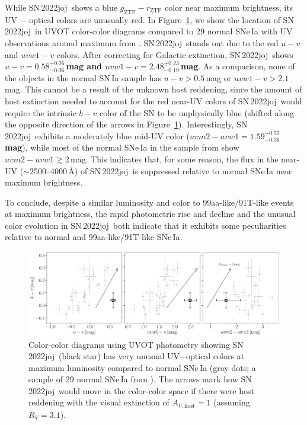 \documentclass[twocolumn]{aastex631}
\newcommand{\sn}{SN\,2022joj}
\newcommand{\rev}[1]{\textbf{#1}}
\begin{document}
\begin{CJK*}{UTF8}{gbsn}
While \sn\ shows a blue $g_\mathrm{ZTF}-r_\mathrm{ZTF}$ color near maximum brightness, its UV $-$ optical colors are unusually red. In Figure~\ref{fig:UVOT}, we show the location of \sn\ in UVOT color-color diagrams compared to 29 normal SNe\,Ia with UV observations around maximum from \citet{Brown_2018}. \sn\ stands out due to the red $u-v$ and $uvw1-v$ colors. After correcting for Galactic extinction, \sn\ shows \rev{$u-v=0.58^{+0.06}_{-0.06}$\,mag and $uvw1 - v=2.48^{+0.23}_{-0.19}$\,mag}. As a comparison, none of the objects in the normal SN\,Ia sample has $u-v>0.5$\,mag or $uvw1 - v>2.1$\,mag. This cannot be a result of the unknown host reddening, since the amount of host extinction needed to account for the red near-UV colors of \sn\ would require the intrinsic $b-v$ color of the SN to be unphysically blue (shifted along the opposite direction of the arrows in Figure~\ref{fig:UVOT}). Interestingly, \sn\ exhibits a moderately blue mid-UV color (\rev{$uvm2-uvw1=1.59^{+0.55}_{-0.36}$\,mag}), while most of the normal SNe\,Ia in the sample from \citet{Brown_2018} show $uvm2-uvw1\gtrsim2$\,mag. This indicates that, for some reason, the flux in the near-UV ($\sim$2500--4000\,\r{A}) of \sn\ is suppressed relative to normal SNe\,Ia near maximum brightness.

To conclude, despite a similar luminosity and color to 99aa-like/91T-like events at maximum brightness, the rapid photometric rise and decline and the unusual color evolution in \sn\ both indicate that it exhibits some peculiarities relative to normal and 99aa-like/91T-like SNe\,Ia.

\begin{figure}
    \centering
    \includegraphics[width=\linewidth]{UVOT_colors.pdf}
    \caption{Color-color diagrams using UVOT photometry showing \sn\ (black star) has very unusual UV$-$optical colors at maximum luminosity compared to normal SNe\,Ia (gray dots; a sample of 29 normal SNe\,Ia from \citealp{Brown_2018}). The arrows mark how \sn\ would move in the color-color space if there were host reddening with the visual extinction of $A_{V,\mathrm{host}}=1$ (assuming $R_V=3.1$).
    }
    \label{fig:UVOT}
\end{figure}



\end{CJK*}
\end{document}
